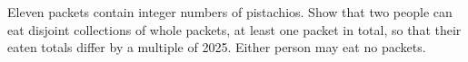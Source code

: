 Eleven packets contain integer numbers of pistachios. Show that two people can eat disjoint collections of whole packets, at least one packet in total, so that their eaten totals differ by a multiple of 2025. Either person may eat no packets.
